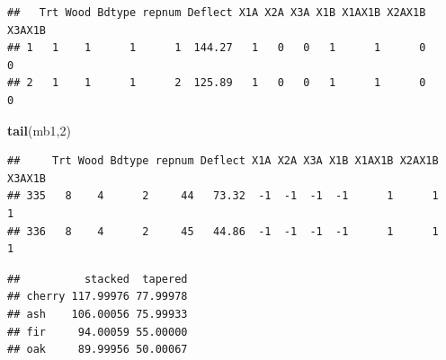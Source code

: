 \documentclass[
]{book}
\newenvironment{Shaded}{\begin{snugshade}}{\end{snugshade}}
\newcommand{\AttributeTok}[1]{\textcolor[rgb]{0.13,0.29,0.53}{#1}}
\newcommand{\DecValTok}[1]{\textcolor[rgb]{0.00,0.00,0.81}{#1}}
\newcommand{\FunctionTok}[1]{\textcolor[rgb]{0.13,0.29,0.53}{\textbf{#1}}}
\newcommand{\NormalTok}[1]{#1}
\newcommand{\OtherTok}[1]{\textcolor[rgb]{0.56,0.35,0.01}{#1}}
\newcommand{\SpecialCharTok}[1]{\textcolor[rgb]{0.81,0.36,0.00}{\textbf{#1}}}
\newcommand{\StringTok}[1]{\textcolor[rgb]{0.31,0.60,0.02}{#1}}
\begin{document}
\begin{verbatim}
##   Trt Wood Bdtype repnum Deflect X1A X2A X3A X1B X1AX1B X2AX1B X3AX1B
## 1   1    1      1      1  144.27   1   0   0   1      1      0      0
## 2   1    1      1      2  125.89   1   0   0   1      1      0      0
\end{verbatim}

\begin{Shaded}
\begin{Highlighting}[]
\FunctionTok{tail}\NormalTok{(mb1,}\DecValTok{2}\NormalTok{)}
\end{Highlighting}
\end{Shaded}

\begin{verbatim}
##     Trt Wood Bdtype repnum Deflect X1A X2A X3A X1B X1AX1B X2AX1B X3AX1B
## 335   8    4      2     44   73.32  -1  -1  -1  -1      1      1      1
## 336   8    4      2     45   44.86  -1  -1  -1  -1      1      1      1
\end{verbatim}

\begin{Shaded}
\end{Shaded}

\begin{verbatim}
##          stacked  tapered
## cherry 117.99976 77.99978
## ash    106.00056 75.99933
## fir     94.00059 55.00000
## oak     89.99956 50.00067
\end{verbatim}
\end{document}
